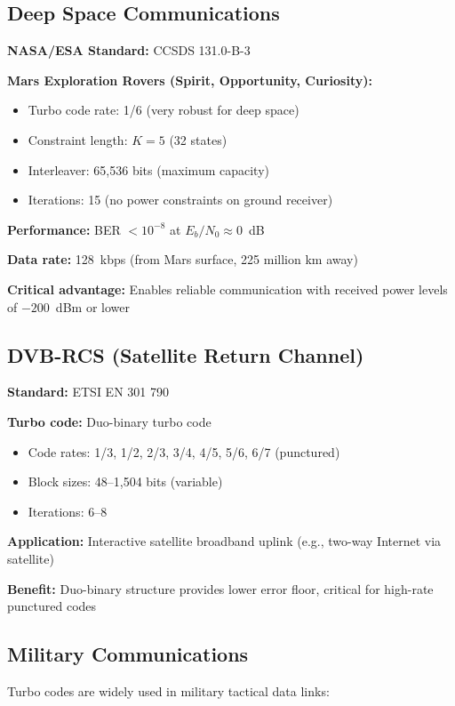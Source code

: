 \subsection{Deep Space Communications}

\textbf{NASA/ESA Standard:} CCSDS 131.0-B-3

\textbf{Mars Exploration Rovers (Spirit, Opportunity, Curiosity):}
\begin{itemize}
\item Turbo code rate: 1/6 (very robust for deep space)
\item Constraint length: $K = 5$ (32 states)
\item Interleaver: 65,536 bits (maximum capacity)
\item Iterations: 15 (no power constraints on ground receiver)
\end{itemize}

\textbf{Performance:} BER $< 10^{-8}$ at $E_b/N_0 \approx 0$~dB

\textbf{Data rate:} 128~kbps (from Mars surface, 225 million km away)

\textbf{Critical advantage:} Enables reliable communication with received power levels of $-200$~dBm or lower

\subsection{DVB-RCS (Satellite Return Channel)}

\textbf{Standard:} ETSI EN 301 790

\textbf{Turbo code:} Duo-binary turbo code
\begin{itemize}
\item Code rates: 1/3, 1/2, 2/3, 3/4, 4/5, 5/6, 6/7 (punctured)
\item Block sizes: 48--1,504 bits (variable)
\item Iterations: 6--8
\end{itemize}

\textbf{Application:} Interactive satellite broadband uplink (e.g., two-way Internet via satellite)

\textbf{Benefit:} Duo-binary structure provides lower error floor, critical for high-rate punctured codes

\subsection{Military Communications}

Turbo codes are widely used in military tactical data links:

